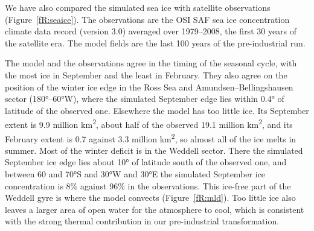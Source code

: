We have also compared the simulated sea ice with satellite observations (Figure~\ref{fR:seaice}). The observations are the OSI SAF sea ice concentration climate data record (version 3.0) averaged over 1979–2008, the first 30 years of the satellite era. The model fields are the last 100 years of the pre-industrial run.


The model and the observations agree in the timing of the seasonal cycle, with the most ice in September and the least in February. They also agree on the position of the winter ice edge in the Ross Sea and Amundsen–Bellingshausen sector (180°–60°W), where the simulated September edge lies within 0.4° of latitude of the observed one. Elsewhere the model has too little ice. Its September extent is 9.9 million km\textsuperscript{2}, about half of the observed 19.1 million km\textsuperscript{2}, and its February extent is 0.7 against 3.3 million km\textsuperscript{2}, so almost all of the ice melts in summer. Most of the winter deficit is in the Weddell sector. There the simulated September ice edge lies about 10° of latitude south of the observed one, and between 60 and 70°S and 30°W and 30°E the simulated September ice concentration is 8\% against 96\% in the observations. This ice-free part of the Weddell gyre is where the model convects (Figure~\ref{fR:mld}). Too little ice also leaves a larger area of open water for the atmosphere to cool, which is consistent with the strong thermal contribution in our pre-industrial transformation.
